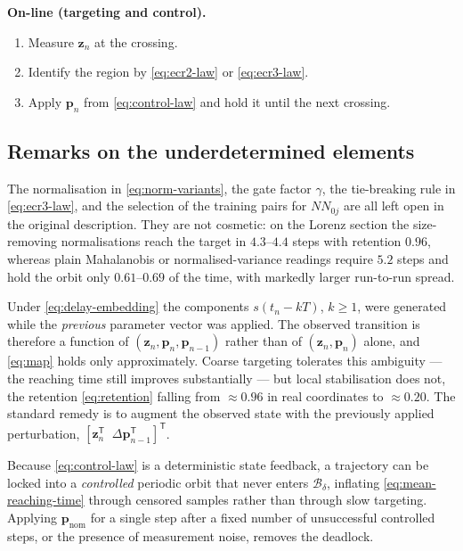 \noindent\textbf{On-line (targeting and control).}
\begin{enumerate}
\item Measure $\mathbf{z}_n$ at the crossing.
\item Identify the region by \eqref{eq:ecr2-law} or \eqref{eq:ecr3-law}.
\item Apply $\mathbf{p}_n$ from \eqref{eq:control-law} and hold it until the
next crossing.
\end{enumerate}

\subsection{Remarks on the underdetermined elements}
\label{subsec:ecr-remarks}

\begin{remark}
The normalisation in \eqref{eq:norm-variants}, the gate factor $\gamma$, the
tie-breaking rule in \eqref{eq:ecr3-law}, and the selection of the training
pairs for $NN_{0j}$ are all left open in the original description. They are not
cosmetic: on the Lorenz section the size-removing normalisations reach the
target in $4.3$--$4.4$ steps with retention $0.96$, whereas plain Mahalanobis
or normalised-variance readings require $5.2$ steps and hold the orbit only
$0.61$--$0.69$ of the time, with markedly larger run-to-run spread.
\end{remark}

\begin{remark}
\label{rem:delay}
Under \eqref{eq:delay-embedding} the components $s(t_n-kT)$, $k\ge1$, were
generated while the \emph{previous} parameter vector was applied. The observed
transition is therefore a function of $(\mathbf{z}_n,\mathbf{p}_n,\mathbf{p}_{n-1})$
rather than of $(\mathbf{z}_n,\mathbf{p}_n)$ alone, and \eqref{eq:map} holds
only approximately. Coarse targeting tolerates this ambiguity --- the reaching
time still improves substantially --- but local stabilisation does not, the
retention \eqref{eq:retention} falling from $\approx0.96$ in real coordinates
to $\approx0.20$. The standard remedy is to augment the observed state with the
previously applied perturbation, $[\mathbf{z}_n^{\mathsf T}\;\;\Delta\mathbf{p}_{n-1}^{\mathsf T}]^{\mathsf T}$.
\end{remark}

\begin{remark}
Because \eqref{eq:control-law} is a deterministic state feedback, a trajectory
can be locked into a \emph{controlled} periodic orbit that never enters
$\mathcal{B}_\delta$, inflating \eqref{eq:mean-reaching-time} through censored
samples rather than through slow targeting. Applying $\mathbf{p}_{\mathrm{nom}}$
for a single step after a fixed number of unsuccessful controlled steps, or the
presence of measurement noise, removes the deadlock.
\end{remark}
